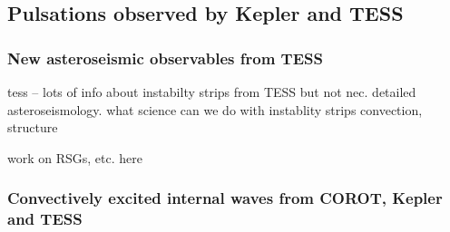 {\color{blue}
\subsection{Pulsations observed by Kepler and TESS}



\subsubsection{New asteroseismic observables from TESS}

tess -- lots of info about instabilty strips from TESS but not nec. detailed asteroseismology.  what science can we do with instablity strips  convection, structure

work on RSGs, etc. here

\subsubsection{Convectively excited internal waves from COROT, Kepler and TESS}


}